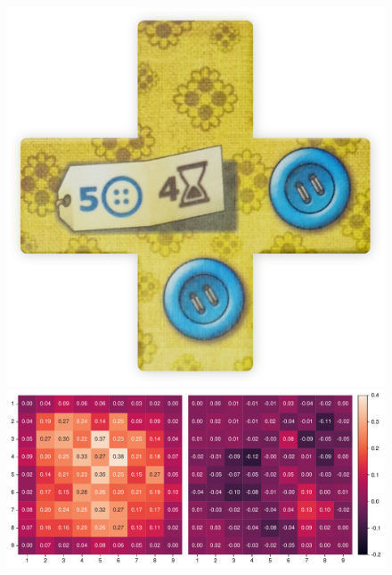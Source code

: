 \begin{figure}[!ht]
    \centering
    \begin{minipage}{.11\textwidth}
        \centering
        \includegraphics[width=\linewidth]{res/pictures/assets/17-front.png}
    \end{minipage}
    \begin{minipage}{.78\textwidth}
        \centering
        \includegraphics[width=\linewidth]{res/pictures/plots/17-action-ordering.pdf}
    \end{minipage}
    \begin{minipage}{.11\textwidth}
        \hfill
    \end{minipage}
    \label{fig:action-ordering-patch-17}
\end{figure}

